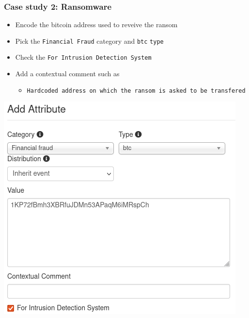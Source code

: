 \begin{frame}
    \frametitle{Case study 2: Ransomware}
    \begin{itemize}
        \item Encode the bitcoin address used to reveive the ransom
        \item Pick the \texttt{Financial Fraud} category and \texttt{btc}  \texttt{type}
        \item Check the \texttt{For Intrusion Detection System}
        \item Add a contextual comment such as
        \begin{itemize}
            \item \texttt{Hardcoded address on which the ransom is asked to be transfered}
        \end{itemize}
    \end{itemize}
    \begin{center}
        \includegraphics[width=0.47\linewidth]{pictures/case2/attribute-btc.png}
    \end{center}
\end{frame}

